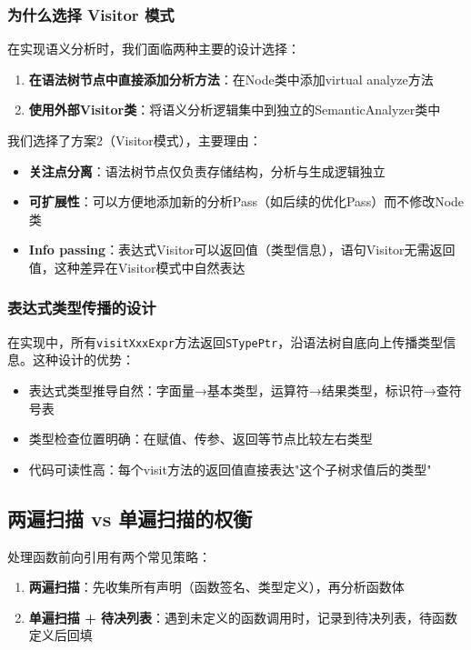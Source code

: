 \documentclass[12pt,a4paper]{ctexart}
\begin{document}
\subsubsection{为什么选择 Visitor 模式}

在实现语义分析时，我们面临两种主要的设计选择：

\begin{enumerate}
    \item \textbf{在语法树节点中直接添加分析方法}：在Node类中添加virtual analyze方法
    \item \textbf{使用外部Visitor类}：将语义分析逻辑集中到独立的SemanticAnalyzer类中
\end{enumerate}

我们选择了方案2（Visitor模式），主要理由：
\begin{itemize}
    \item \textbf{关注点分离}：语法树节点仅负责存储结构，分析与生成逻辑独立
    \item \textbf{可扩展性}：可以方便地添加新的分析Pass（如后续的优化Pass）而不修改Node类
    \item \textbf{Info passing}：表达式Visitor可以返回值（类型信息），语句Visitor无需返回值，这种差异在Visitor模式中自然表达
\end{itemize}

\subsubsection{表达式类型传播的设计}

在实现中，所有\texttt{visitXxxExpr}方法返回\texttt{STypePtr}，沿语法树自底向上传播类型信息。这种设计的优势：
\begin{itemize}
    \item 表达式类型推导自然：字面量→基本类型，运算符→结果类型，标识符→查符号表
    \item 类型检查位置明确：在赋值、传参、返回等节点比较左右类型
    \item 代码可读性高：每个visit方法的返回值直接表达"这个子树求值后的类型"
\end{itemize}

\subsection{两遍扫描 vs 单遍扫描的权衡}

处理函数前向引用有两个常见策略：

\begin{enumerate}
    \item \textbf{两遍扫描}：先收集所有声明（函数签名、类型定义），再分析函数体
    \item \textbf{单遍扫描 + 待决列表}：遇到未定义的函数调用时，记录到待决列表，待函数定义后回填
\end{enumerate}
\end{document}
